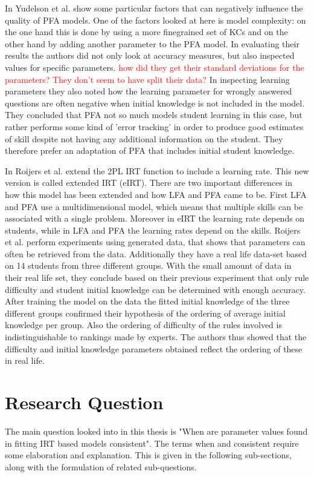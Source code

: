 \documentclass{scrartcl}
\newcommand\todo[1]{\textcolor{red}{#1}}
\begin{document}
In \cite{blackart} Yudelson et al. show some particular factors that can negatively influence the quality of PFA models. One of the factors looked at here is model complexity: on the one hand this is done by using a more finegrained set of KCs and on the other hand by adding another parameter to the PFA model. In evaluating their results the authors did not only look at accuracy measures, but also inspected values for specific parameters. \todo{how did they get their standard deviations for the parameters? They don't seem to have split their data?} In inspecting learning parameters they also noted how the learning parameter for wrongly answered questions are often negative when initial knowledge is not included in the model. They concluded that PFA not so much models student learning in this case, but rather performs some kind of 'error tracking' in order to produce good estimates of skill despite not having any additional information on the student. They therefore prefer an adaptation of PFA that includes initial student knowledge.

In \cite{eirt} Roijers et al. extend the 2PL IRT function to include a learning rate. This new version is called extended IRT (eIRT). There are two important differences in how this model has been extended and how LFA and PFA came to be. First LFA and PFA use a multidimensional model, which means that multiple skills can be associated with a single problem. Moreover in eIRT the learning rate depends on students, while in LFA and PFA the learning rates depend on the skills. Roijers et al. perform experiments using generated data, that shows that parameters can often be retrieved from the data. Additionally they have a real life data-set based on 14 students from three different groups. With the small amount of data in their real life set, they conclude based on their previous experiment that only rule difficulty and student initial knowledge can be determined with enough accuracy. After training the model on the data the fitted initial knowledge of the three different groups confirmed their hypothesis of the ordering of average initial knowledge per group. Also the ordering of difficulty of the rules involved is indistinguishable to rankings made by experts. The authors thus showed that the difficulty and initial knowledge parameters obtained reflect the ordering of these in real life.


\section{Research Question}
\label{sec:RQ}
The main question looked into in this thesis is "When are parameter values found in fitting IRT based models consistent". The terms when and consistent require some elaboration and explanation. This is given in the following sub-sections, along with the formulation of related sub-questions.
\end{document}
